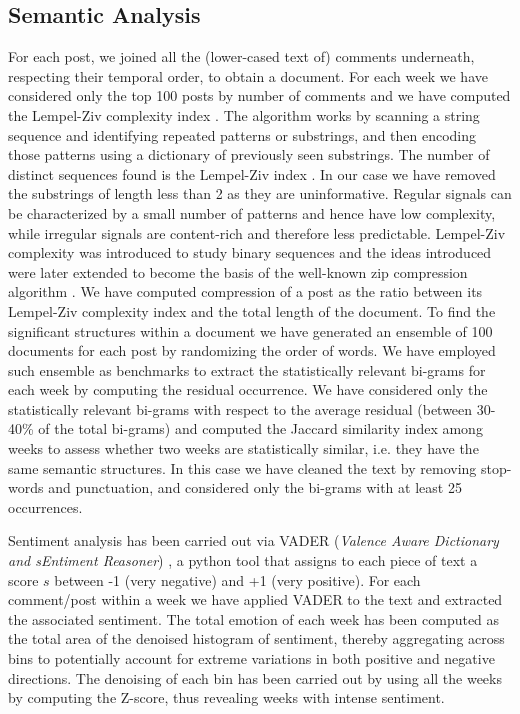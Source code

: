 \documentclass[fleqn,10pt]{wlscirep}
\begin{document}
\subsection*{Semantic Analysis}
For each post, we joined all the (lower-cased text of) comments underneath, respecting their temporal order, to obtain a document.
%
For each week we have considered only the top 100 posts by number of comments and we have computed the Lempel-Ziv complexity index \cite{lempel1976complexity}. 
The algorithm works by scanning a string sequence and identifying repeated patterns or substrings, and then encoding those patterns using a dictionary of previously seen substrings. The number of distinct sequences found is the Lempel-Ziv index \cite{lempel1976complexity}. In our case we have removed the substrings of length less than 2 as they are uninformative.
Regular signals can be characterized by a small number of patterns and hence have low complexity, while irregular signals are content-rich and therefore less predictable. Lempel-Ziv complexity was introduced to study binary sequences and the ideas introduced were later extended to become the basis of the well-known zip compression algorithm \cite{deutsch1996deflate}.
We have computed compression of a post as the ratio between its Lempel-Ziv complexity index and the total length of the document.
To find the significant structures within a document we have generated an ensemble of 100 documents for each post by randomizing the order of words. We have employed such ensemble as benchmarks to extract the statistically relevant bi-grams for each week by computing the residual occurrence.
We have considered only the statistically relevant bi-grams with respect to the average residual (between 30-40\% of the total bi-grams) and computed the Jaccard similarity index among weeks to assess whether two weeks are statistically similar, i.e. they have the same semantic structures. In this case we have cleaned the text by removing stop-words and punctuation, and considered only the bi-grams with at least 25 occurrences.

Sentiment analysis has been carried out via VADER (\emph{Valence Aware Dictionary and sEntiment Reasoner}) \cite{hutto2014VADER}, a python tool that assigns to each piece of text a score $s$ between -1 (very negative) and +1 (very positive). For each comment/post within a week we have applied VADER to the text and extracted the associated sentiment.
The total emotion of each week has been computed as the total area of the denoised histogram of sentiment, thereby aggregating across bins to potentially account for extreme variations in both positive and negative directions. The denoising of each bin has been carried out by using all the weeks by computing the Z-score, thus revealing weeks with intense sentiment.
%
\end{document}
